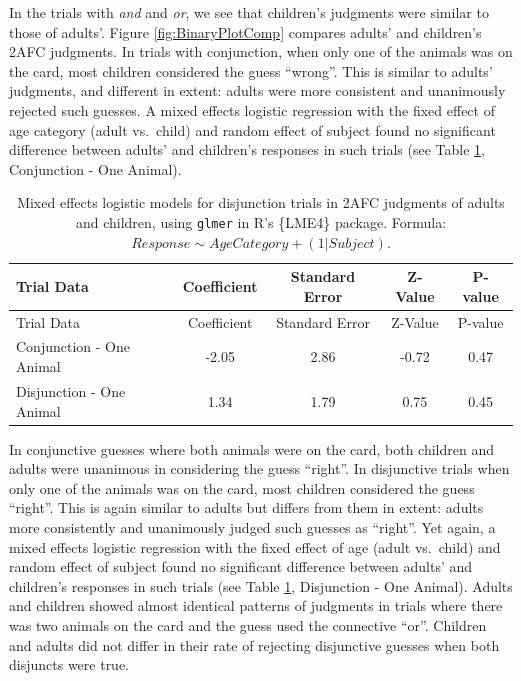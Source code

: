 \documentclass[oneside]{report}
\theoremstyle{definition}
\theoremstyle{definition}
\theoremstyle{definition}
\theoremstyle{remark}
\begin{document}
In the trials with \emph{and} and \emph{or}, we see that children's
judgments were similar to those of adults'. Figure
\ref{fig:BinaryPlotComp} compares adults' and children's 2AFC judgments.
In trials with conjunction, when only one of the animals was on the
card, most children considered the guess ``wrong''. This is similar to
adults' judgments, and different in extent: adults were more consistent
and unanimously rejected such guesses. A mixed effects logistic
regression with the fixed effect of age category (adult vs.~child) and
random effect of subject found no significant difference between adults'
and children's responses in such trials (see Table
\ref{tab:statsStudy3}, Conjunction - One Animal).
\begin{longtable}[]{@{}lcccc@{}}
\caption{\label{tab:statsStudy3} Mixed effects logistic models for
disjunction trials in 2AFC judgments of adults and children, using
\texttt{glmer} in R's \{LME4\} package. Formula:
\(Response \sim Age Category + (1|Subject)\).}\tabularnewline
\toprule
Trial Data & Coefficient & Standard Error & Z-Value &
P-value\tabularnewline
\midrule
\endfirsthead
\toprule
Trial Data & Coefficient & Standard Error & Z-Value &
P-value\tabularnewline
\midrule
\endhead
Conjunction - One Animal & -2.05 & 2.86 & -0.72 & 0.47\tabularnewline
Disjunction - One Animal & 1.34 & 1.79 & 0.75 & 0.45\tabularnewline
\bottomrule
\end{longtable}
In conjunctive guesses where both animals were on the card, both
children and adults were unanimous in considering the guess ``right''.
In disjunctive trials when only one of the animals was on the card, most
children considered the guess ``right''. This is again similar to adults
but differs from them in extent: adults more consistently and
unanimously judged such guesses as ``right''. Yet again, a mixed effects
logistic regression with the fixed effect of age (adult vs.~child) and
random effect of subject found no significant difference between adults'
and children's responses in such trials (see Table
\ref{tab:statsStudy3}, Disjunction - One Animal). Adults and children
showed almost identical patterns of judgments in trials where there was
two animals on the card and the guess used the connective ``or''.
Children and adults did not differ in their rate of rejecting
disjunctive guesses when both disjuncts were true.
\end{document}
